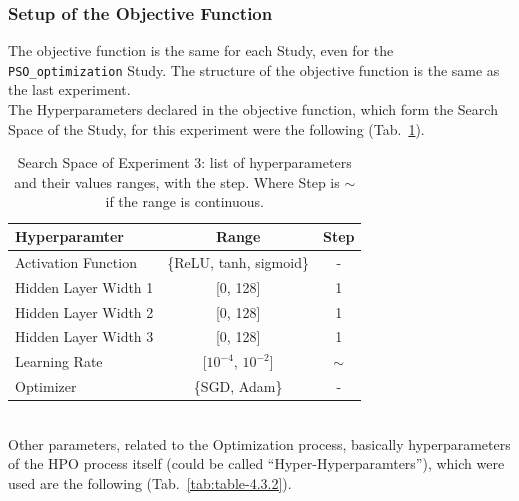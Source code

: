 \subsubsection{Setup of the Objective Function}

The objective function is the same for each Study, even for the \texttt{PSO\_optimization} Study. The structure of the objective function is the same as the last experiment.
% 
\\[0.3cm]The Hyperparameters declared in the objective function, which form the Search Space of the Study, for this experiment were the following (Tab.~\ref{tab:table-4.3.1}).
\begin{table}[ht!]
	\center
	\setlength{\tabcolsep}{0.5cm}
	\caption[Search Space of Experiment 3]{Search Space of Experiment 3: list of hyperparameters and their values ranges, with the step. Where Step is $\sim$ if the range is continuous.}
	\begin{tabular}{@{}lcc@{}}
		\toprule
		\textbf{Hyperparamter} & \textbf{Range}             & \textbf{Step} \\ \midrule
		Activation Function    & \{ReLU, tanh, sigmoid\}    & -             \\[0.1cm]
		Hidden Layer Width 1   & {[}0, 128{]}               & 1             \\[0.1cm]
		Hidden Layer Width 2   & {[}0, 128{]}               & 1             \\[0.1cm]
		Hidden Layer Width 3   & {[}0, 128{]}               & 1             \\[0.1cm]
		Learning Rate          & {[}$10^{-4}$, $10^{-2}${]} & $\sim$        \\[0.1cm]
		Optimizer              & \{SGD, Adam\}              & -             \\ \bottomrule
	\end{tabular}
	\label{tab:table-4.3.1}
\end{table}
% 
\\[0.3cm]Other parameters, related to the Optimization process, basically hyperparameters of the HPO process itself (could be called “Hyper-Hyperparamters”), which were used are the following (Tab.~\ref{tab:table-4.3.2}).
